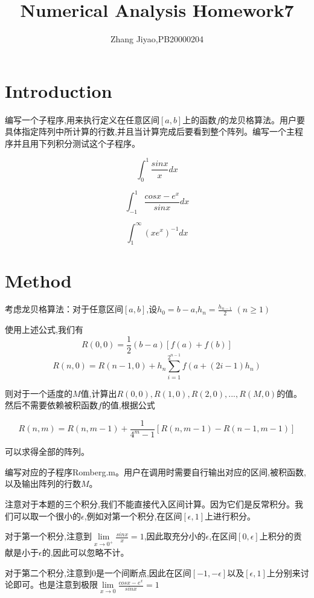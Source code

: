 \documentclass{article}
\title{Numerical Analysis Homework7}
\author{Zhang Jiyao,PB20000204}
\begin{document}
	\maketitle
	
	\section{Introduction}
	编写一个子程序,用来执行定义在任意区间$[a,b]$上的函数$f$的龙贝格算法。用户要具体指定阵列中所计算的行数,并且当计算完成后要看到整个阵列。编写一个主程序并且用下列积分测试这个子程序。
	
	\begin{equation}
		\int_0^{1}\frac{sinx}{x}dx
	\end{equation}

	\begin{equation}
	\int_{-1}^{1}\frac{cosx-e^x}{sinx}dx
    \end{equation}

	\begin{equation}
	\int_1^{\infty}(xe^x)^{-1}dx
    \end{equation}
		
	\section{Method}
	
	考虑龙贝格算法：对于任意区间$[a,b]$,设$h_0=b-a$,$h_n=\frac{h_{n-1}}{2} $  $(n\geq 1)$
	
	使用上述公式,我们有
	$$ R(0,0)=\frac{1}{2}(b-a)[f(a)+f(b)]$$
	$$ R(n,0)=R(n-1,0)+h_n\sum_{i=1}^{2^{n-1}}f(a+(2i-1)h_n)$$
	
	则对于一个适度的$M$值,计算出$R(0,0),R(1,0),R(2,0),...,R(M,0)$的值。然后不需要依赖被积函数$f$的值,根据公式
	
	$$R(n,m)=R(n,m-1)+\frac{1}{4^m-1}[R(n,m-1)-R(n-1,m-1)]$$
	
	可以求得全部的阵列。
	
	编写对应的子程序Romberg.m。用户在调用时需要自行输出对应的区间,被积函数,以及输出阵列的行数$M$。
	
	注意对于本题的三个积分,我们不能直接代入区间计算。因为它们是反常积分。我们可以取一个很小的$\epsilon$,例如对第一个积分,在区间$[\epsilon,1]$上进行积分。
	
	对于第一个积分,注意到$\lim\limits_{x\to 0^{+}}\frac{sinx}{x}=1$,因此取充分小的$\epsilon$,在区间$[0,\epsilon]$上积分的贡献是小于$\epsilon$的,因此可以忽略不计。
	
	对于第二个积分,注意到0是一个间断点,因此在区间$[-1,-\epsilon]$以及$[\epsilon,1]$上分别来讨论即可。也是注意到极限$\lim\limits_{x\to 0}\frac{cosx-e^x}{sinx}=1$
	
\end{document}
